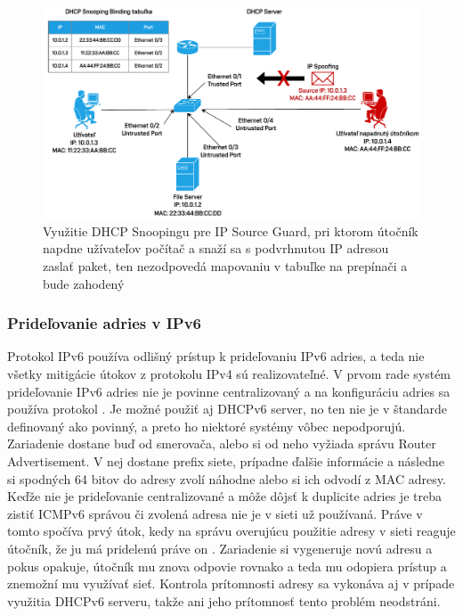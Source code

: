 \begin{figure}[H]
	\begin{center}
		\includegraphics[scale=0.75]{obrazky/dhcp-snoop.pdf}
	\end{center}
	\caption[DHCP Snooping a IP Source Guard]{Využitie DHCP Snoopingu pre IP Source Guard, pri ktorom útočník napdne užívateľov počítač a snaží sa s podvrhnutou IP adresou zaslať paket, ten nezodpovedá mapovaniu v tabuľke na prepínači a bude zahodený}
	\label{fig:dot1x}
\end{figure}    

\subsubsection*{Prideľovanie adries v IPv6}
Protokol IPv6 používa odlišný prístup k prideľovaniu IPv6 adries, a teda nie všetky mitigácie útokov z protokolu IPv4 sú realizovateľné. V prvom rade systém prideľovanie IPv6 adries nie je povinne centralizovaný a na konfiguráciu adries sa používa protokol . Je možné použiť aj DHCPv6 server, no ten nie je v štandarde definovaný ako povinný, a preto ho niektoré systémy vôbec nepodporujú. Zariadenie dostane buď od smerovača, alebo si od neho  vyžiada správu Router Advertisement. V nej dostane prefix siete, prípadne ďalšie informácie a následne si spodných 64 bitov do adresy zvolí náhodne alebo si ich odvodí z MAC adresy. Keďže nie je prideľovanie centralizované a môže dôjsť k duplicite adries je treba zistiť ICMPv6 správou či zvolená adresa nie je v sieti už používaná. Práve v tomto spočíva prvý útok, kedy na správu overujúcu použitie adresy v sieti reaguje útočník, že ju má pridelenú práve on \cite{Hg83oflOfHBGeWfs}. Zariadenie si vygeneruje novú adresu a pokus opakuje, útočník mu znova odpovie rovnako a teda mu odopiera prístup a znemožní mu využívať sieť. Kontrola prítomnosti adresy sa vykonáva aj v prípade využitia DHCPv6 serveru, takže ani jeho prítomnosť tento problém neodstráni. 

